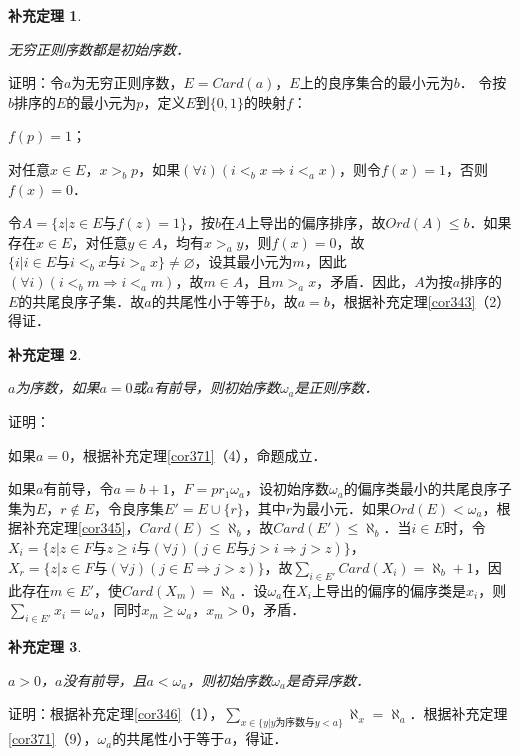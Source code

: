 \documentclass[12pt, a4paper, oneside]{book}
\newtheorem{cor}{补充定理}
\begin{document}
			\begin{cor}\label{cor372}
				\hfill\par
				无穷正则序数都是初始序数．
			\end{cor}
			证明：令$a$为无穷正则序数，$E=Card(a)$，$E$上的良序集合的最小元为$b$．
			令按$b$排序的$E$的最小元为$p$，定义$E$到$\{0, 1\}$的映射$f$：
			\par
			$f(p)=1$；
			\par
			对任意$x\in E$，$x>_bp$，如果$(\forall i)(i<_bx\Rightarrow i<_ax)$，则令$f(x)=1$，否则$f(x)=0$．
			\par
			令$A=\{z|z\in E\text{与}f(z)=1\}$，按$b$在$A$上导出的偏序排序，故$Ord(A)\leq b$．如果存在$x\in E$，对任意$y\in A$，均有$x>_ay$，则$f(x)=0$，故$\{i|i\in E\text{与}i<_bx\text{与}i>_ax\}\neq \varnothing$，设其最小元为$m$，因此$(\forall i)(i<_bm\Rightarrow i<_am)$，故$m\in A$，且$m>_ax$，矛盾．因此，$A$为按$a$排序的$E$的共尾良序子集．故$a$的共尾性小于等于$b$，故$a=b$，根据补充定理\ref{cor343}（2）得证．
			
			\begin{cor}\label{cor373}
				\hfill\par
				$a$为序数，如果$a=0$或$a$有前导，则初始序数$\omega_a$是正则序数．
			\end{cor}
			证明：
			\par
			如果$a=0$，根据补充定理\ref{cor371}（4），命题成立．
			\par
			如果$a$有前导，令$a=b+1$，$F=pr_1\omega_a$，设初始序数$\omega_a$的偏序类最小的共尾良序子集为$E$，$r\notin E$，令良序集$E'=E\cup\{r\}$，其中$r$为最小元．如果$Ord(E)<\omega_a$，根据补充定理\ref{cor345}，$Card(E)\leq \aleph_b$，故$Card(E')\leq \aleph_b$．当$i\in E$时，令$X_i=\{z|z\in F\text{与}z\geq i\text{与}(\forall j)(j\in E\text{与}j>i\Rightarrow j>z)\}$，$X_r=\{z|z\in F\text{与}(\forall j)(j\in E\Rightarrow j>z)\}$，故$\sum\limits_{i\in E'}Card(X_i)=\aleph_b+1$，因此存在$m\in E'$，使$Card(X_m)=\aleph_a$．设$\omega_a$在$X_i$上导出的偏序的偏序类是$x_i$，则$\sum\limits_{i\in E'}x_i=\omega_a$，同时$x_m\geq \omega_a$，$x_m>0$，矛盾．
			
			\begin{cor}\label{cor374}
				\hfill\par
				$a>0$，$a$没有前导，且$a<\omega_a$，则初始序数$\omega_a$是奇异序数．
			\end{cor}
			证明：根据补充定理\ref{cor346}（1），$\sum\limits_{x\in \{y|y\text{为序数}\text{与}y<a\}}\aleph_x=\aleph_a$．根据补充定理\ref{cor371}（9），$\omega_a$的共尾性小于等于$a$，得证．
			
\end{document}
